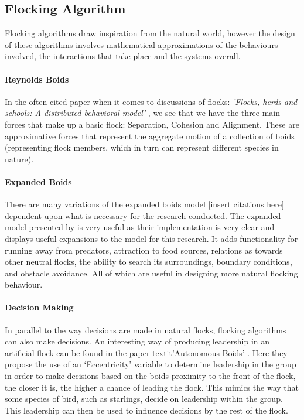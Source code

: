 \subsection{Flocking Algorithm}
Flocking algorithms draw inspiration from the natural world, however the design of these algorithms involves mathematical approximations of the behaviours involved, the interactions that take place and the systems overall.

\paragraph{Reynolds Boids}
In the often cited paper when it comes to discussions of flocks: \textit{'Flocks, herds and schools: A distributed behavioral model'} \citet{Reynolds:1987:FHS:37402.37406}, we see that we have the three main forces that make up a basic flock: Separation, Cohesion and Alignment. These are approximative forces that represent the aggregate motion of a collection of boids (representing flock members, which in turn can represent different species in nature).
	
	\paragraph{Expanded Boids} %
	There are many variations of the expanded boids model [insert citations here] dependent upon what is necessary for the research conducted. The expanded model presented by \citet{4604156} is very useful as their implementation is very clear and displays useful expansions to the model for this research. It adds functionality for running away from predators, attraction to food sources, relations as towards other neutral flocks, the ability to search its surroundings, boundary conditions, and obstacle avoidance. All of which are useful in designing more natural flocking behaviour.
	
	\paragraph{Decision Making}
	In parallel to the way decisions are made in natural flocks, flocking algorithms can also make decisions. An interesting way of producing leadership in an artificial flock can be found in the paper textit{'Autonomous Boids’} \citet{HartmanC2006Ab}. Here they propose the use of an ‘Eccentricity’ variable to determine leadership in the group in order to make decisions based on the boids proximity to the front of the flock, the closer it is, the higher a chance of leading the flock. This mimics the way that some species of bird, such as starlings, decide on leadership within the group. This leadership can then be used to influence decisions by the rest of the flock.
	
